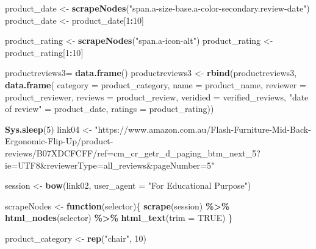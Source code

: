 \documentclass[
]{article}
\newenvironment{Shaded}{\begin{snugshade}}{\end{snugshade}}
\newcommand{\AttributeTok}[1]{\textcolor[rgb]{0.13,0.29,0.53}{#1}}
\newcommand{\ConstantTok}[1]{\textcolor[rgb]{0.56,0.35,0.01}{#1}}
\newcommand{\ControlFlowTok}[1]{\textcolor[rgb]{0.13,0.29,0.53}{\textbf{#1}}}
\newcommand{\DecValTok}[1]{\textcolor[rgb]{0.00,0.00,0.81}{#1}}
\newcommand{\FunctionTok}[1]{\textcolor[rgb]{0.13,0.29,0.53}{\textbf{#1}}}
\newcommand{\NormalTok}[1]{#1}
\newcommand{\OtherTok}[1]{\textcolor[rgb]{0.56,0.35,0.01}{#1}}
\newcommand{\SpecialCharTok}[1]{\textcolor[rgb]{0.81,0.36,0.00}{\textbf{#1}}}
\newcommand{\StringTok}[1]{\textcolor[rgb]{0.31,0.60,0.02}{#1}}
\begin{document}
\begin{Shaded}
\begin{Highlighting}[]
\NormalTok{  product\_date }\OtherTok{\textless{}{-}} \FunctionTok{scrapeNodes}\NormalTok{(}\StringTok{"span.a{-}size{-}base.a{-}color{-}secondary.review{-}date"}\NormalTok{)}
\NormalTok{  product\_date }\OtherTok{\textless{}{-}}\NormalTok{ product\_date[}\DecValTok{1}\SpecialCharTok{:}\DecValTok{10}\NormalTok{]}
  
\NormalTok{  product\_rating }\OtherTok{\textless{}{-}} \FunctionTok{scrapeNodes}\NormalTok{(}\StringTok{"span.a{-}icon{-}alt"}\NormalTok{)}
\NormalTok{  product\_rating }\OtherTok{\textless{}{-}}\NormalTok{ product\_rating[}\DecValTok{1}\SpecialCharTok{:}\DecValTok{10}\NormalTok{]}
  
\NormalTok{  productreviews3}\OtherTok{=} \FunctionTok{data.frame}\NormalTok{()}
\NormalTok{  productreviews3 }\OtherTok{\textless{}{-}} \FunctionTok{rbind}\NormalTok{(productreviews3, }\FunctionTok{data.frame}\NormalTok{(}
                      \AttributeTok{category =}\NormalTok{ product\_category,}
                      \AttributeTok{name =}\NormalTok{ product\_name,}
                      \AttributeTok{reviewer =}\NormalTok{ product\_reviewer,}
                      \AttributeTok{reviews =}\NormalTok{ product\_review,}
                      \AttributeTok{veridied =}\NormalTok{ verified\_reviews,}
                      \StringTok{"date of review"} \OtherTok{=}\NormalTok{ product\_date,}
                      \AttributeTok{ratings =}\NormalTok{ product\_rating))}
  
   \FunctionTok{Sys.sleep}\NormalTok{(}\DecValTok{5}\NormalTok{)}
\NormalTok{link04 }\OtherTok{\textless{}{-}} \StringTok{"https://www.amazon.com.au/Flash{-}Furniture{-}Mid{-}Back{-}Ergonomic{-}Flip{-}Up/product{-}reviews/B07XDCFCFF/ref=cm\_cr\_getr\_d\_paging\_btm\_next\_5?ie=UTF8\&reviewerType=all\_reviews\&pageNumber=5"}


\NormalTok{  session }\OtherTok{\textless{}{-}} \FunctionTok{bow}\NormalTok{(link02,}
               \AttributeTok{user\_agent =} \StringTok{"For Educational Purpose"}\NormalTok{)}

\NormalTok{  scrapeNodes }\OtherTok{\textless{}{-}} \ControlFlowTok{function}\NormalTok{(selector)\{}
    \FunctionTok{scrape}\NormalTok{(session) }\SpecialCharTok{\%\textgreater{}\%}
      \FunctionTok{html\_nodes}\NormalTok{(selector) }\SpecialCharTok{\%\textgreater{}\%}
      \FunctionTok{html\_text}\NormalTok{(}\AttributeTok{trim =} \ConstantTok{TRUE}\NormalTok{)}
\NormalTok{  \}}

\NormalTok{  product\_category }\OtherTok{\textless{}{-}} \FunctionTok{rep}\NormalTok{(}\StringTok{"chair"}\NormalTok{, }\DecValTok{10}\NormalTok{)}


\end{Highlighting}
\end{Shaded}
\end{document}
